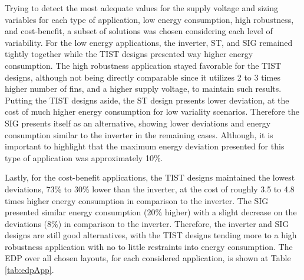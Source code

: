 \documentclass[diss,pgmicro,english]{iiufrgs}
\begin{document}
Trying to detect the most adequate values for the supply voltage and sizing variables for each type of application, low energy consumption, high robustness, and cost-benefit, a subset of solutions was chosen considering each level of variability. For the low energy applications, the inverter, ST, and SIG remained tightly together while the TIST designs presented way higher energy consumption. The high robustness application stayed favorable for the TIST designs, although not being directly comparable since it utilizes 2 to 3 times higher number of fins, and a higher supply voltage, to maintain such results. Putting the TIST designs aside, the ST design presents lower deviation, at the cost of much higher energy consumption for low variality scenarios. Therefore the SIG presents itself as an alternative, showing lower deviations and energy consumption similar to the inverter in the remaining cases. Although, it is important to highlight that the maximum energy deviation presented for this type of application was approximately 10\%.

Lastly, for the cost-benefit applications, the TIST designs maintained the lowest deviations, 73\% to 30\% lower than the inverter, at the cost of roughly 3.5 to 4.8 times higher energy consumption in comparison to the inverter. The SIG presented similar energy consumption (20\% higher) with a slight decrease on the deviations (8\%) in comparison to the inverter. Therefore, the inverter and SIG designs are still good alternatives, with the TIST designs tending more to a high robustness application with no to little restraints into energy consumption. The EDP over all chosen layouts, for each considered application, is shown at Table \ref{tab:edpApp}.

\begin{table}[]
\centering
\caption{EDP for each chosen design for the considered applications.}
\label{tab:edpApp}
\end{table}
\end{document}
